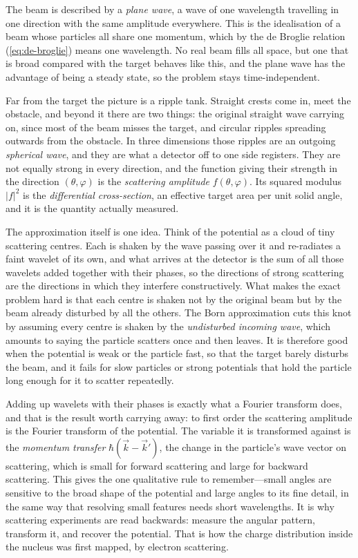         The beam is described by a \emph{plane wave}, a wave of one wavelength travelling in one direction with the same amplitude everywhere. This is the idealisation of a beam whose particles all share one momentum, which by the de Broglie relation (\cref{eq:de-broglie}) means one wavelength. No real beam fills all space, but one that is broad compared with the target behaves like this, and the plane wave has the advantage of being a steady state, so the problem stays time-independent.

        Far from the target the picture is a ripple tank. Straight crests come in, meet the obstacle, and beyond it there are two things: the original straight wave carrying on, since most of the beam misses the target, and circular ripples spreading outwards from the obstacle. In three dimensions those ripples are an outgoing \emph{spherical wave}, and they are what a detector off to one side registers. They are not equally strong in every direction, and the function giving their strength in the direction $(\theta,\varphi)$ is the \emph{scattering amplitude} $f(\theta,\varphi)$. Its squared modulus $|f|^{2}$ is the \emph{differential cross-section}, an effective target area per unit solid angle, and it is the quantity actually measured.

        The approximation itself is one idea. Think of the potential as a cloud of tiny scattering centres. Each is shaken by the wave passing over it and re-radiates a faint wavelet of its own, and what arrives at the detector is the sum of all those wavelets added together with their phases, so the directions of strong scattering are the directions in which they interfere constructively. What makes the exact problem hard is that each centre is shaken not by the original beam but by the beam already disturbed by all the others. The Born approximation cuts this knot by assuming every centre is shaken by the \emph{undisturbed incoming wave}, which amounts to saying the particle scatters once and then leaves. It is therefore good when the potential is weak or the particle fast, so that the target barely disturbs the beam, and it fails for slow particles or strong potentials that hold the particle long enough for it to scatter repeatedly.

        Adding up wavelets with their phases is exactly what a Fourier transform does, and that is the result worth carrying away: to first order the scattering amplitude is the Fourier transform of the potential. The variable it is transformed against is the \emph{momentum transfer} $\hbar(\vec{k} - \vec{k}')$, the change in the particle's wave vector on scattering, which is small for forward scattering and large for backward scattering. This gives the one qualitative rule to remember---small angles are sensitive to the broad shape of the potential and large angles to its fine detail, in the same way that resolving small features needs short wavelengths. It is why scattering experiments are read backwards: measure the angular pattern, transform it, and recover the potential. That is how the charge distribution inside the nucleus was first mapped, by electron scattering.

